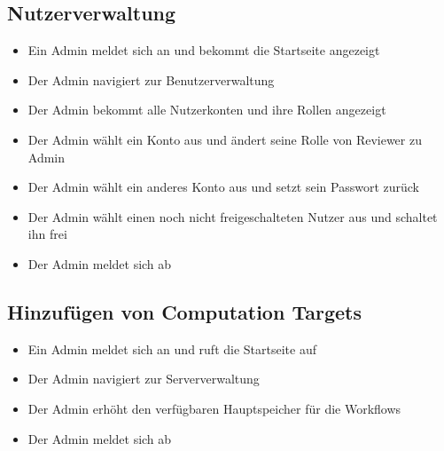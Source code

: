 \subsection*{Nutzerverwaltung}
\begin{itemize}
    \item Ein \Gls{Admin} meldet sich an und bekommt die Startseite angezeigt
    \item Der \Gls{Admin} navigiert zur Benutzerverwaltung
    \item Der \Gls{Admin} bekommt alle Nutzerkonten und ihre Rollen angezeigt
    \item Der \Gls{Admin} wählt ein Konto aus und ändert seine Rolle von \Gls{Reviewer} zu \Gls{Admin}
    \item Der \Gls{Admin} wählt ein anderes Konto aus und setzt sein Passwort zurück
    \item Der \Gls{Admin} wählt einen noch nicht freigeschalteten Nutzer aus und schaltet ihn frei
    \item Der \Gls{Admin} meldet sich ab
\end{itemize}


\subsection*{Hinzufügen von Computation Targets}
\begin{itemize}
    \item Ein \Gls{Admin} meldet sich an und ruft die Startseite auf
    \item Der \Gls{Admin} navigiert zur Serververwaltung
    \item Der \gls{Admin} erhöht den verfügbaren Hauptspeicher für die Workflows
    \item Der \gls{Admin} meldet sich ab
\end{itemize}
